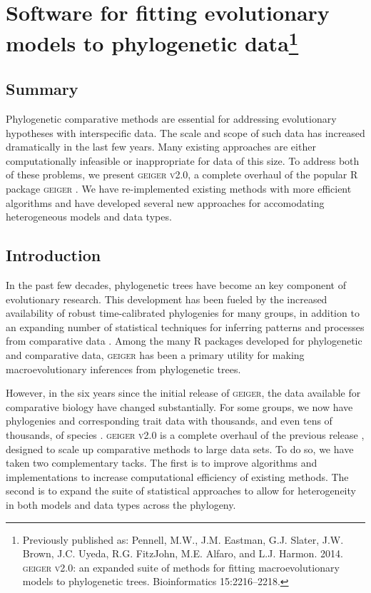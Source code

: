 \chapter[Software for fitting evolutionary models to phylogenetic data]{Software for fitting evolutionary models to phylogenetic data\footnote{Previously published as: Pennell, M.W., J.M. Eastman, G.J. Slater, J.W. Brown, J.C. Uyeda,
  R.G. FitzJohn, M.E. Alfaro, and L.J. Harmon. 2014.
  \textsc{geiger v2.0}: an expanded suite of methods for fitting macroevolutionary
  models to phylogenetic trees. Bioinformatics 15:2216--2218.}} 
\label{chap:geiger}

\section{Summary}
Phylogenetic comparative methods are essential for addressing evolutionary hypotheses with interspecific data. The scale and scope of such data has increased dramatically in the last few years. Many existing approaches are either computationally infeasible or inappropriate for data of this size. To address both of these problems, we present \textsc{geiger v2.0}, a complete overhaul of the popular R package \textsc{geiger} \citep{Harmon2008}. We have re-implemented existing methods with more efficient algorithms and have developed several new approaches for accomodating heterogeneous models and data types.  


\section{Introduction}

In the past few decades, phylogenetic trees have become an key component of evolutionary research. This development has been fueled by the increased availability of robust time-calibrated phylogenies for many groups, in addition to an expanding number of statistical techniques for inferring patterns and processes from comparative data \citep[reviewed in][]{PennellHarmon}. Among the many R packages developed for phylogenetic and comparative data, \textsc{geiger} \citep{Harmon2008} has been a primary utility for making macroevolutionary inferences from phylogenetic trees. 

However, in the six years since the initial release of \textsc{geiger}, the data available for comparative biology have changed substantially. For some groups, we now have phylogenies and corresponding trait data with thousands, and even tens of thousands, of species \citep[e.g.,][]{Jetz2012, Rabosky2012, PyronBurbrink2013, ksi,Zanne}. \textsc{geiger v2.0} is a complete overhaul of the previous release \citep{Harmon2008}, designed to scale up comparative methods to large data sets. To do so,  we have taken two complementary tacks. The first is to improve algorithms and implementations to increase computational efficiency of existing methods. The second is to expand the suite of statistical approaches to allow for heterogeneity in both models and data types across the phylogeny.  


